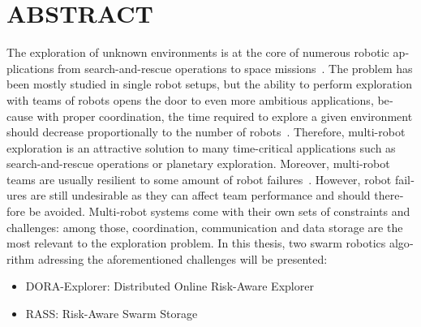 %

\chapter*{ABSTRACT}\thispagestyle{headings}

\begin{otherlanguage}{english}
The exploration of unknown environments is at the core of numerous
robotic applications from search-and-rescue operations
\cite{matos2016multiple} to space
missions~\cite{fong2005interaction}. The problem has been mostly
studied in single robot setups, but the ability to perform exploration
with teams of robots opens the door to even more ambitious
applications, because with proper coordination, the time required to
explore a given environment should decrease proportionally to the
number of robots~\cite{burgard2005coordinated}. Therefore, multi-robot
exploration is an attractive solution to many time-critical
applications such as search-and-rescue operations or planetary
exploration. Moreover, multi-robot teams are usually resilient to some
amount of robot
failures~\cite{ramachandran2019resilience,wehbe2021probabilistic,winfield2006safety}. However,
robot failures are still undesirable as they can affect team
performance and should therefore be avoided. Multi-robot systems come with their own sets of constraints and
challenges: among those, coordination, communication and data storage are the most
relevant to the exploration problem. In this thesis, two swarm robotics algorithm adressing the aforementioned challenges will be presented:

\begin{itemize}
    \item DORA-Explorer: Distributed Online Risk-Aware Explorer
    \item RASS: Risk-Aware Swarm Storage
\end{itemize}


\end{otherlanguage}
